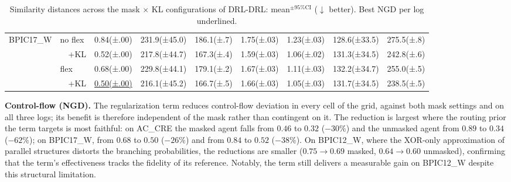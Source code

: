 \documentclass[journal,onecolumn]{IEEEtran}
\begin{document}
\begin{table}[!ht]
\begin{tabular}{ll ccccccc}
\midrule
\multirow{4}{*}{BPIC17\_W}
  & no flex   & 0.84{\tiny(±.00)} & 231.9{\tiny(±45.0)} & 186.1{\tiny(±.7)} & 1.75{\tiny(±.03)} & 1.23{\tiny(±.03)} & 128.6{\tiny(±33.5)} & 275.5{\tiny(±.8)} \\
  & ~~+KL     & 0.52{\tiny(±.00)} & 217.8{\tiny(±44.7)} & 167.3{\tiny(±.4)} & 1.59{\tiny(±.03)} & 1.06{\tiny(±.02)} & 131.3{\tiny(±34.5)} & 242.8{\tiny(±.6)} \\
  & flex      & 0.68{\tiny(±.00)} & 229.8{\tiny(±44.1)} & 179.1{\tiny(±.2)} & 1.67{\tiny(±.03)} & 1.11{\tiny(±.03)} & 132.2{\tiny(±34.7)} & 255.0{\tiny(±.5)} \\
  & ~~+KL     & \underline{0.50{\tiny(±.00)}} & 216.1{\tiny(±45.2)} & 166.7{\tiny(±.5)} & 1.66{\tiny(±.03)} & 1.05{\tiny(±.03)} & 131.7{\tiny(±34.5)} & 238.5{\tiny(±.5)} \\
\bottomrule
\end{tabular}
\caption[Similarity distances under mask $\times$ KL configurations]{Similarity distances across the mask $\times$ KL
configurations of DRL-DRL: mean$^{\pm\text{95\% CI}}$ ($\downarrow$
better). Best NGD per log underlined.}
\label{tab:reg_similarity}
\end{table}

\noindent\textbf{Control-flow (NGD).}
The regularization term reduces control-flow deviation in every cell of
the grid, against both mask settings and on all three logs; its
benefit is therefore independent of the mask rather than contingent on
it. The reduction is largest where the routing prior the term targets
is most faithful: on AC\_CRE the masked agent falls from $0.46$ to
$0.32$ ($-30\%$) and the unmasked agent from $0.89$ to $0.34$
($-62\%$); on BPIC17\_W, from $0.68$ to $0.50$ ($-26\%$) and from
$0.84$ to $0.52$ ($-38\%$). On BPIC12\_W, where the XOR-only
approximation of parallel structures distorts the branching
probabilities, the reductions are smaller ($0.75 \to 0.69$ masked,
$0.64 \to 0.60$ unmasked), confirming that the term's effectiveness
tracks the fidelity of its reference. Notably, the term still delivers
a measurable gain on BPIC12\_W despite this structural limitation.
\end{document}
